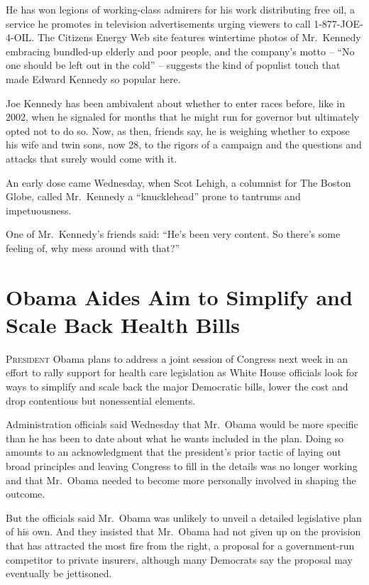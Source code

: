 ﻿\documentclass[12pt]{article}
\begin{document}
He has won legions\cite{legion} of working-class admirers for his work distributing free oil, a
service he promotes in television advertisements urging viewers to call 1-877-JOE-4-OIL. The
Citizens Energy Web site features wintertime photos of Mr.~Kennedy embracing bundled-up elderly and
poor people, and the company's motto -- ``No one should be left out in the cold'' -- suggests the
kind of populist touch that made Edward Kennedy so popular here.

Joe Kennedy has been ambivalent\cite{ambivalent} about whether to enter races before, like in 2002,
when he signaled for months that he might run for governor but ultimately opted not to do so. Now,
as then, friends say, he is weighing whether to expose his wife and twin sons, now 28, to the
rigors\cite{rigor} of a campaign and the questions and attacks that surely would come with it.

An early dose came Wednesday, when Scot Lehigh, a columnist for The Boston Globe, called Mr.~Kennedy
a ``knucklehead'' prone to tantrums\cite{tantrum} and impetuousness.

One of Mr.~Kennedy's friends said: ``He's been very content. So there's some feeling of, why mess
around with that?''

\section{Obama Aides Aim to Simplify and Scale Back Health Bills}

\lettrine{P}{resident} Obama plans to address a joint session of Congress next week in an effort to
rally support for health care legislation as White House officials look for ways to simplify and
scale back the major Democratic bills, lower the cost and drop contentious but nonessential
elements.

Administration officials said Wednesday that Mr.~Obama would be more specific than he has been to
date about what he wants included in the plan. Doing so amounts to an acknowledgment that the
president's prior tactic of laying out broad principles and leaving Congress to fill in the details
was no longer working and that Mr.~Obama needed to become more personally involved in shaping the
outcome.

But the officials said Mr.~Obama was unlikely to unveil a detailed legislative plan of his own. And
they insisted that Mr.~Obama had not given up on the provision that has attracted the most fire from
the right, a proposal for a government-run competitor to private insurers, although many Democrats
say the proposal may eventually be jettisoned.
\end{document}
